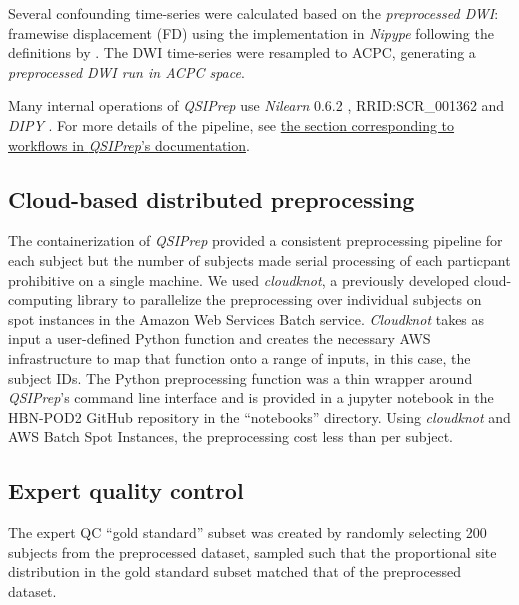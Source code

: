 \documentclass[fleqn,10pt]{wlscirep}
\begin{document}
\begin{itemize}
Several confounding time-series were calculated based on the
\emph{preprocessed DWI}: framewise displacement (FD) using the implementation
in \emph{Nipype} following the definitions by \cite{power-fd-dvars}. The DWI
time-series were resampled to ACPC, generating a \emph{preprocessed DWI run
in ACPC space}.

\end{itemize}

Many internal operations of \emph{QSIPrep} use \emph{Nilearn} 0.6.2
\cite{nilearn}, RRID:SCR\_001362 and \emph{DIPY} \cite{dipy}. For more details
of the pipeline, see
\href{https://qsiprep.readthedocs.io/en/latest/workflows.html}{the section
corresponding to workflows in \emph{QSIPrep}'s documentation}.

\subsection*{Cloud-based distributed preprocessing}

The containerization of \emph{QSIPrep} provided a consistent preprocessing
pipeline for each subject but the number of subjects made serial processing of
each particpant prohibitive on a single machine. We used \emph{cloudknot}, a
previously developed cloud-computing library \cite{cloudknot} to
parallelize the preprocessing over individual subjects on spot instances in the
Amazon Web Services Batch service. \emph{Cloudknot} takes as input a
user-defined Python function and creates the necessary AWS infrastructure to map
that function onto a range of inputs, in this case, the subject IDs. The Python
preprocessing function was a thin wrapper around \emph{QSIPrep}'s command line
interface and is provided in a jupyter notebook in the HBN-POD2 GitHub
repository in the ``notebooks'' directory.  Using \emph{cloudknot} and AWS Batch
Spot Instances, the preprocessing cost less than  per subject.

\subsection*{Expert quality control}

The expert QC ``gold standard'' subset was created by randomly selecting 200
subjects from the preprocessed dataset, sampled such that the proportional site
distribution in the gold standard subset matched that of the preprocessed
dataset.
\end{document}
